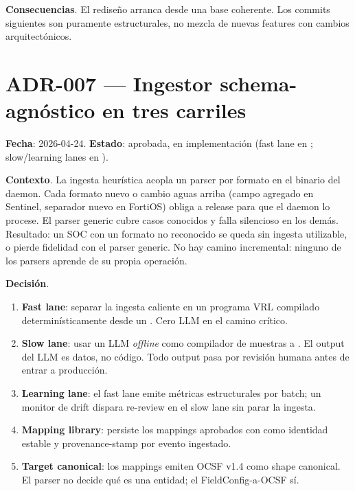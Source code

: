 \textbf{Consecuencias}. El rediseño arranca desde una base
coherente. Los commits siguientes son puramente estructurales, no
mezcla de nuevas features con cambios arquitectónicos.

\section*{ADR-007 — Ingestor schema-agnóstico en tres carriles}
\label{sec:adr-007}

\textbf{Fecha}: 2026-04-24. \textbf{Estado}: aprobada, en
implementación (fast lane en ; slow/learning
lanes en ).

\textbf{Contexto}. La ingesta heurística acopla un parser por
formato en el binario del daemon. Cada formato nuevo o cambio
aguas arriba (campo agregado en Sentinel, separador nuevo en
FortiOS) obliga a release para que el daemon lo procese. El parser
generic cubre casos conocidos y falla silencioso en los demás.
Resultado: un SOC con un formato no reconocido se queda sin ingesta
utilizable, o pierde fidelidad con el parser generic. No hay
camino incremental: ninguno de los parsers aprende de su propia
operación.

\textbf{Decisión}.

\begin{enumerate}
    \item \textbf{Fast lane}: separar la ingesta caliente en un
    programa VRL compilado determinísticamente desde un
    . Cero LLM en el camino crítico.
    \item \textbf{Slow lane}: usar un LLM \emph{offline} como
    compilador de muestras a . El output del LLM
    es datos, no código. Todo output pasa por revisión humana antes
    de entrar a producción.
    \item \textbf{Learning lane}: el fast lane emite métricas
    estructurales por batch; un monitor de drift dispara re-review
    en el slow lane sin parar la ingesta.
    \item \textbf{Mapping library}:
     persiste los mappings
    aprobados con  como identidad
    estable y provenance-stamp por evento ingestado.
    \item \textbf{Target canonical}: los mappings emiten OCSF v1.4
    como shape canonical. El parser no decide qué es una entidad;
    el FieldConfig-a-OCSF sí.
\end{enumerate}


